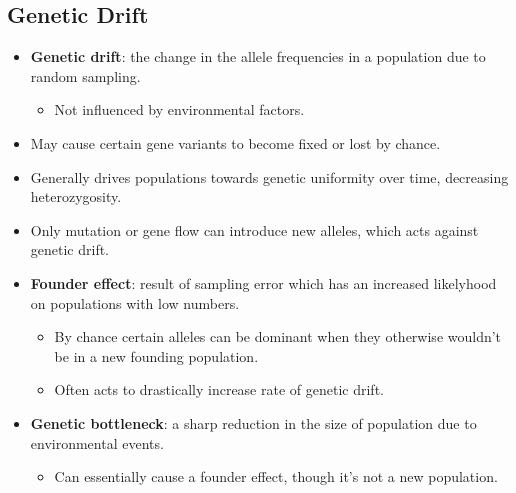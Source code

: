 \documentclass[12pt,a4paper]{article}
\begin{document}
\subsection{Genetic Drift}
\begin{itemize}
    \item \textbf{Genetic drift}: the change in the {\color{o-Sun} allele frequencies} in a population due to {\color{o-Sun}random sampling}.
        \begin{itemize}
            \item Not influenced by environmental factors.
        \end{itemize}
    \item May cause certain gene variants to become fixed or lost by chance.
    \item Generally drives populations towards genetic uniformity over time, {\color{o-Sun}decreasing heterozygosity}.
    \item Only mutation or gene flow can introduce new alleles, which acts against genetic drift.
    \item \textbf{Founder effect}: result of sampling error which has an increased likelyhood on populations with low numbers.
        \begin{itemize}
            \item By chance certain alleles can be dominant when they otherwise wouldn't be in a new founding population.
            \item Often acts to drastically increase rate of genetic drift.
        \end{itemize}
    \item \textbf{Genetic bottleneck}: a sharp reduction in the size of population due to environmental events. 
        \begin{itemize}
            \item Can essentially cause a founder effect, though it's not a new population.
        \end{itemize}

\end{itemize}
\end{document}
